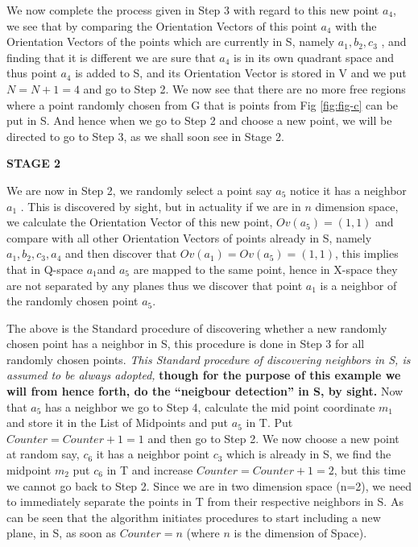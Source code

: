 \documentclass[english]{article}
\begin{document}
We now complete the process given in Step 3 with regard to this new
point $a_{4}$, we see that by comparing the Orientation Vectors of
this point $a_{4}$ with the Orientation Vectors of the points which
are currently in S, namely $a_{1},b_{2},c_{3}$ , and finding that
it is different we are sure that $a_{4}$ is in its own quadrant space
and thus point $a_{4}$ is added to S, and its Orientation Vector is
stored in V and we put $N=N+1=4$ and go to Step 2. We now see that
there are no more free regions where a point randomly chosen from G that is points from Fig \ref{fig:fig-c} can be put in S.
And hence when we go to Step 2 and choose a new point, we will be directed to go to Step 3, as we shall soon see in Stage 2.
  

\medskip{}
\medskip{}


\textbf{STAGE 2}

 We are now in Step 2, we randomly select a point say $a_{5}$ notice
it has a neighbor $a_{1}$ . This is discovered by sight, but in actuality 
if we are in $n$ dimension space, we calculate the Orientation Vector
of this new point, $Ov(a_{5})=(1,1)$ and compare with all other Orientation
Vectors of points already in S, namely $a_{1},b_{2},c_{3},a_{4}$
and then discover that $Ov(a_{1})=Ov(a_{5})=(1,1)$, this implies
that in Q-space $a_{1}$and $a_{5}$ are mapped to the same point,
hence in X-space they are not separated by any planes thus we discover
that point $a_{1}$ is a neighbor of the randomly chosen point $a_{5}$.

The above is the Standard procedure of discovering whether a new randomly
chosen point has a neighbor in S, this procedure is done in Step
3 for all randomly chosen points. \textit{This Standard procedure
of discovering neighbors in S, is assumed to be always adopted,} \textbf{
though for the purpose of this example we will from hence forth, do
the {}``neigbour detection'' in S, by sight. }Now that $a_{5}$ has
a neighbor we go to Step 4, calculate the mid point coordinate $m_{1}$ and
store it in the List of Midpoints and put $a_{5}$ in T. Put $Counter=Counter+1=1$
and then go to Step 2. We now choose a new point at random say, $c_{6}$
it has a neighbor point $c_{3}$ which is already in S, we find the
midpoint $m_{2}$ put $c_{6}$ in T and increase $Counter=Counter+1=2$, 
but this time we cannot go back to Step 2. Since we are in two dimension
space (n=2), we need to immediately separate the points in T from
their respective neighbors in S. As can be seen that the algorithm initiates procedures to start including a new plane, in S, as soon as $Counter=n$ (where $n$ is the dimension of Space).
\end{document}

